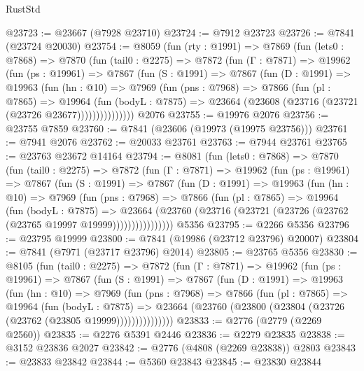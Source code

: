 \begin{lexlean}{RustStd}
\begin{coremodule}
{\begin{coremodule}
{{{{{{{{{{{{{{{{{{{{{{{{{{{{{{{{{{{{{{{{{{{{{{{{{{{{{{@23723 := @23667 (@7928 @23710)
@23724 := @7912 @23723
@23726 := @7841 (@23724 @20030)
@23754 := @8059
    (fun (rty : @1991) =>
    @7869
      (fun (lets0 : @7868) =>
      @7870
        (fun (tail0 : @2275) =>
        @7872
          (fun (Γ : @7871) =>
          @19962
            (fun (ps : @19961) =>
            @7867
              (fun (S : @1991) =>
              @7867
                (fun (D : @1991) =>
                @19963
                  (fun (hn : @10) =>
                  @7969
                    (fun (pns : @7968) =>
                    @7866
                      (fun (pl : @7865) =>
                      @19964
                        (fun (bodyL : @7875) =>
                        @23664 (@23608 (@23716 (@23721 (@23726 @23677)))))))))))))))
    @2076
@23755 := @19976 @2076
@23756 := @23755 @7859
@23760 := @7841 (@23606 (@19973 (@19975 @23756)))
@23761 := @7941 @2076
@23762 := @20033 @23761
@23763 := @7944 @23761
@23765 := @23763 @23672 @14164
@23794 := @8081
    (fun (lets0 : @7868) =>
    @7870
      (fun (tail0 : @2275) =>
      @7872
        (fun (Γ : @7871) =>
        @19962
          (fun (ps : @19961) =>
          @7867
            (fun (S : @1991) =>
            @7867
              (fun (D : @1991) =>
              @19963
                (fun (hn : @10) =>
                @7969
                  (fun (pns : @7968) =>
                  @7866
                    (fun (pl : @7865) =>
                    @19964
                      (fun (bodyL : @7875) =>
                      @23664
                        (@23760
                          (@23716 (@23721 (@23726 (@23762 (@23765 @19997 @19999))))))))))))))))
    @5356
@23795 := @2266 @5356
@23796 := @23795 @19999
@23800 := @7841 (@19986 (@23712 @23796) @20007)
@23804 := @7841 (@7971 (@23717 @23796) @2014)
@23805 := @23765 @5356
@23830 := @8105
    (fun (tail0 : @2275) =>
    @7872
      (fun (Γ : @7871) =>
      @19962
        (fun (ps : @19961) =>
        @7867
          (fun (S : @1991) =>
          @7867
            (fun (D : @1991) =>
            @19963
              (fun (hn : @10) =>
              @7969
                (fun (pns : @7968) =>
                @7866
                  (fun (pl : @7865) =>
                  @19964
                    (fun (bodyL : @7875) =>
                    @23664 (@23760 (@23800 (@23804 (@23726 (@23762 (@23805 @19999)))))))))))))))
@23833 := @2776 (@2779 (@2269 @2560))
@23835 := @2276 @5391 @2446
@23836 := @2279 @23835
@23838 := @3152 @23836 @2027
@23842 := @2776 (@4808 (@2269 @23838)) @2803
@23843 := @23833 @23842
@23844 := @5360 @23843
@23845 := @23830 @23844
}}}}}}}}}}}}}}}}}}}}}}}}}}}}}}}}}}}}}}}}}}}}}}}}}}}}}}
\end{coremodule}}
\end{coremodule}
\end{lexlean}
